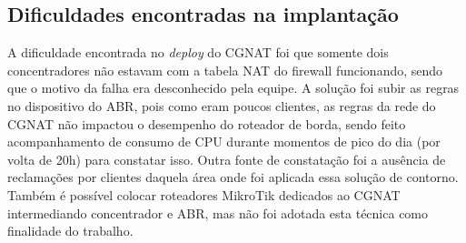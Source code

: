 \subsection{Dificuldades encontradas na implantação}
    
    A dificuldade encontrada no \textit{deploy} do CGNAT foi que somente dois concentradores não estavam com a tabela NAT do firewall funcionando, sendo que o motivo da falha era desconhecido pela equipe. A solução foi subir as regras no dispositivo do ABR, pois como eram poucos clientes, as regras da rede do CGNAT não impactou o desempenho do roteador de borda, sendo feito acompanhamento de consumo de CPU durante momentos de pico do dia (por volta de 20h) para constatar isso. Outra fonte de constatação foi a ausência de reclamações por clientes daquela área onde foi aplicada essa solução de contorno. Também é possível colocar roteadores MikroTik dedicados ao CGNAT intermediando concentrador e ABR, mas não foi adotada esta técnica como finalidade do trabalho.
    